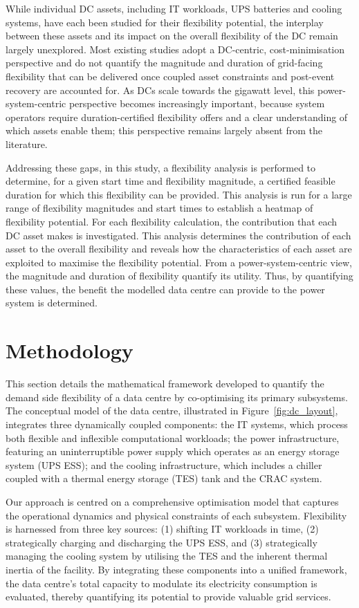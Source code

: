 \documentclass[lettersize,journal]{IEEEtran}
\begin{document}
While individual DC assets, including IT workloads, UPS batteries and cooling systems, have each been studied for their flexibility potential, the interplay between these assets and its impact on the overall flexibility of the DC remain largely unexplored. Most existing studies adopt a DC-centric, cost-minimisation perspective and do not quantify the magnitude and duration of grid-facing flexibility that can be delivered once coupled asset constraints and post-event recovery are accounted for. As DCs scale towards the gigawatt level, this power-system-centric perspective becomes increasingly important, because system operators require duration-certified flexibility offers and a clear understanding of which assets enable them; this perspective remains largely absent from the literature.

Addressing these gaps, in this study, a flexibility analysis is performed to determine, for a given start time and flexibility magnitude, a certified feasible duration for which this flexibility can be provided. This analysis is run for a large range of flexibility magnitudes and start times to establish a heatmap of flexibility potential. For each flexibility calculation, the contribution that each DC asset makes is investigated. This analysis determines the contribution of each asset to the overall flexibility and reveals how the characteristics of each asset are exploited to maximise the flexibility potential. From a power-system-centric view, the magnitude and duration of flexibility quantify its utility. Thus, by quantifying these values, the benefit the modelled data centre can provide to the power system is determined. 

\section{Methodology}
This section details the mathematical framework developed to quantify the demand side flexibility of a data centre by co-optimising its primary subsystems. The conceptual model of the data centre, illustrated in Figure~\ref{fig:dc_layout}, integrates three dynamically coupled components: the IT systems, which process both flexible and inflexible computational workloads; the power infrastructure, featuring an uninterruptible power supply which operates as an energy storage system (UPS ESS); and the cooling infrastructure, which includes a chiller coupled with a thermal energy storage (TES) tank and the CRAC system. 

Our approach is centred on a comprehensive optimisation model that captures the operational dynamics and physical constraints of each subsystem. Flexibility is harnessed from three key sources: (1) shifting IT workloads in time, (2) strategically charging and discharging the UPS ESS, and (3) strategically managing the cooling system by utilising the TES and the inherent thermal inertia of the facility. By integrating these components into a unified framework, the data centre's total capacity to modulate its electricity consumption is evaluated, thereby quantifying its potential to provide valuable grid services.
\end{document}
